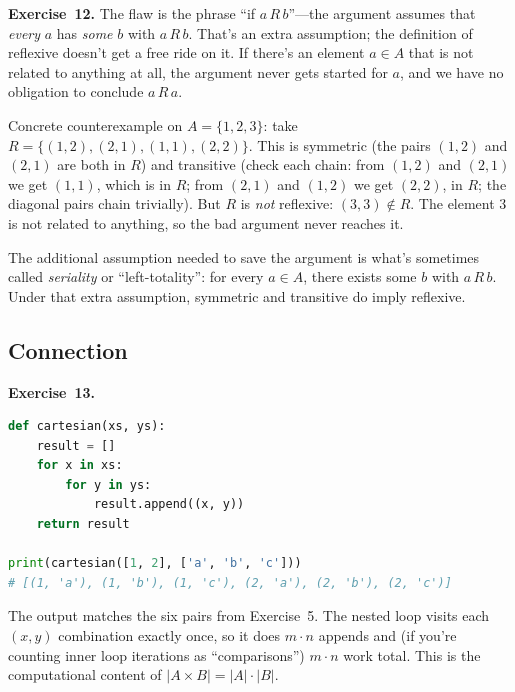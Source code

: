 \documentclass[11pt]{article}
\begin{document}
\medskip
\textbf{Exercise~12.}
The flaw is the phrase ``if $a\, R\, b$''---the argument assumes that \emph{every} $a$ has \emph{some} $b$ with $a\, R\, b$. That's an extra assumption; the definition of reflexive doesn't get a free ride on it. If there's an element $a \in A$ that is not related to anything at all, the argument never gets started for $a$, and we have no obligation to conclude $a\, R\, a$.

Concrete counterexample on $A = \{1, 2, 3\}$: take $R = \{(1, 2), (2, 1), (1, 1), (2, 2)\}$. This is symmetric (the pairs $(1,2)$ and $(2,1)$ are both in $R$) and transitive (check each chain: from $(1,2)$ and $(2,1)$ we get $(1,1)$, which is in $R$; from $(2,1)$ and $(1,2)$ we get $(2,2)$, in $R$; the diagonal pairs chain trivially). But $R$ is \emph{not} reflexive: $(3, 3) \notin R$. The element $3$ is not related to anything, so the bad argument never reaches it.

The additional assumption needed to save the argument is what's sometimes called \emph{seriality} or ``left-totality'': for every $a \in A$, there exists some $b$ with $a\, R\, b$. Under that extra assumption, symmetric and transitive do imply reflexive.

\subsection*{Connection}

\textbf{Exercise~13.}
\begin{lstlisting}[language=Python]
def cartesian(xs, ys):
    result = []
    for x in xs:
        for y in ys:
            result.append((x, y))
    return result

print(cartesian([1, 2], ['a', 'b', 'c']))
# [(1, 'a'), (1, 'b'), (1, 'c'), (2, 'a'), (2, 'b'), (2, 'c')]
\end{lstlisting}

The output matches the six pairs from Exercise~5. The nested loop visits each $(x, y)$ combination exactly once, so it does $m \cdot n$ appends and (if you're counting inner loop iterations as ``comparisons'') $m \cdot n$ work total. This is the computational content of $|A \times B| = |A| \cdot |B|$.
\end{document}
